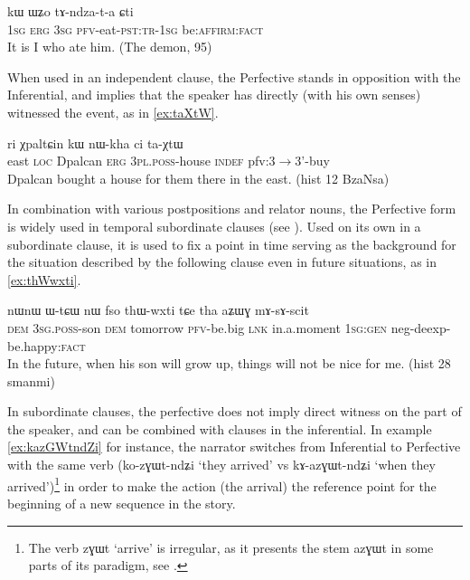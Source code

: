 \documentclass[oldfontcommands,oneside,a4paper,11pt]{article}
\newcommand{\ipa}[1]{{\phon \mbox{#1}}} %
\newcommand{\factual}[1]{\textsc{:fact}}
\begin{document}
\begin{exe}
\ex \label{ex:tAndzata}
\gll \ipa{aʑo} 	\ipa{kɯ} 	\ipa{ɯʑo} 	\ipa{tɤ-ndza-t-a} 	\ipa{ɕti} \\
\textsc{1sg} \textsc{erg} \textsc{3sg} \textsc{pfv}-eat-\textsc{pst:tr-1sg} be:\textsc{affirm:fact} \\
\glt It is I who ate him. (The demon, 95)
\end{exe}

When used in an independent clause,  the Perfective stands in opposition with the Inferential, and implies that the speaker has directly (with his own senses) witnessed the event, as in  \ref{ex:taXtW}.

\begin{exe}
\ex \label{ex:taXtW}
\gll \ipa{akɯ} 	\ipa{ri} 	\ipa{χpaltɕin} 	\ipa{kɯ} 	\ipa{nɯ-kha} 	\ipa{ci} 	\ipa{ta-χtɯ} \\
east \textsc{loc} Dpalcan \textsc{erg} \textsc{3pl.poss}-house \textsc{indef} pfv:3$\rightarrow$3'-buy \\
\glt Dpalcan bought a house for them there in the east. (hist 12 BzaNsa)
\end{exe}

In combination with various postpositions and relator nouns, the Perfective form is widely used in temporal subordinate clauses (see \citealt[284-93]{jacques14linking}). Used on its own in a subordinate clause, it is used to fix a point in time serving as the background for the situation described by the following clause even in future situations, as in \ref{ex:thWwxti}.

\begin{exe}
\ex \label{ex:thWwxti}
\gll 
\ipa{nɯnɯ} 	\ipa{ɯ-tɕɯ} 	\ipa{nɯ} 	\ipa{fso} 	\ipa{thɯ-wxti} 	\ipa{tɕe} 	\ipa{tha} 	\ipa{aʑɯɣ} 	\ipa{mɤ-sɤ-scit}  \\
\textsc{dem} \textsc{3sg.poss}-son \textsc{dem} tomorrow \textsc{pfv}-be.big \textsc{lnk} in.a.moment \textsc{1sg:gen} neg-deexp-be.happy\factual{} \\
\glt In the future, when his son will grow up, things will not be nice for me. (hist 28 smanmi)
\end{exe}

In subordinate clauses, the perfective does not imply direct witness on the part of the speaker, and can be combined with clauses in the inferential. In example \ref{ex:kazGWtndZi} for instance, the narrator switches from Inferential to Perfective with the same verb (\ipa{ko-zɣɯt-ndʑi} `they arrived' vs \ipa{kɤ-azɣɯt-ndʑi} `when they arrived')\footnote{The verb \ipa{zɣɯt} `arrive' is irregular, as it presents the stem \ipa{azɣɯt} in some parts of its paradigm, see \citet[424]{jacques04these}. } in order to make the action (the arrival) the reference point for the beginning of a new sequence in the story.
\end{document}
